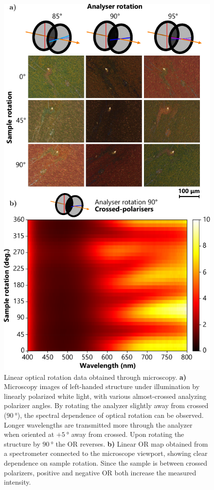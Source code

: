 \begin{figure}[htb!]	
    \centering	
    \includegraphics[scale=1]{./figures/results/OAinPlanarNanohelices/lin_data.pdf}

    \caption{\label{fig:results:OAinPlanarNanohelices:lin_data}
    Linear optical rotation data obtained through microscopy. \textbf{a)} Microscopy images of left-handed structure under illumination by linearly polarized white light, with various almost-crossed analyzing polarizer angles. By rotating the analyzer slightly away from crossed ($\SI{90}{\degree}$), the spectral dependence of optical rotation can be observed. Longer wavelengths are transmitted more through the analyzer when oriented at $+\SI{5}{\degree}$ away from crossed. Upon rotating the structure by $\SI{90}{\degree}$ the OR reverses. \textbf{b)} Linear OR map obtained from a spectrometer connected to the microscope viewport, showing clear dependence on sample rotation. Since the sample is between crossed polarizers, positive and negative OR both increase the measured intensity.}
\end{figure}

